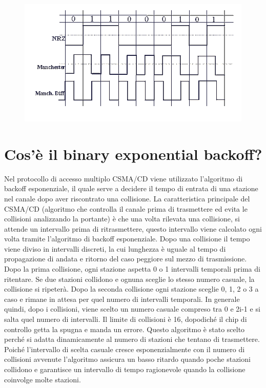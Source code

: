 \begin{figure}[H]
\centering
\includegraphics[scale=0.8]{res/img/28_CodificaManchester.png}
\end{figure}
 
\section{Cos’è il binary exponential backoff?}

Nel protocollo di accesso multiplo CSMA/CD viene utilizzato l’algoritmo di backoff esponenziale, il quale serve a decidere il tempo di entrata di una stazione nel canale dopo aver riscontrato una collisione.
La caratteristica principale del CSMA/CD (algoritmo che controlla il canale prima di trasmettere ed evita le collisioni analizzando la portante) è che una volta rilevata una collisione, si attende un intervallo prima di ritrasmettere, questo intervallo viene calcolato ogni volta tramite l’algoritmo di backoff esponenziale.
Dopo una collisione il tempo viene diviso in intervalli discreti, la cui lunghezza è uguale al tempo di propagazione di andata e ritorno del caso peggiore sul mezzo di trasmissione.
Dopo la prima collisione, ogni stazione aspetta 0 o 1 intervalli temporali prima di ritentare. Se due stazioni collidono e ognuna sceglie lo stesso numero casuale, la collisione si ripeterà. Dopo la seconda collisione ogni stazione sceglie 0, 1, 2 o 3 a caso e rimane in attesa per quel numero di intervalli temporali. In generale quindi, dopo i collisioni, viene scelto un numero casuale compreso tra 0 e 2i-1 e si salta quel numero di intervalli. Il limite di collisioni è 16, dopodiché il chip di controllo getta la spugna e manda un errore.
Questo algoritmo è stato scelto perché si adatta dinamicamente al numero di stazioni che tentano di trasmettere. Poiché l’intervallo di scelta casuale cresce esponenzialmente con il numero di collisioni avvenute l’algoritmo assicura un basso ritardo quando poche stazioni collidono e garantisce un intervallo di tempo ragionevole quando la collisione coinvolge molte stazioni.




